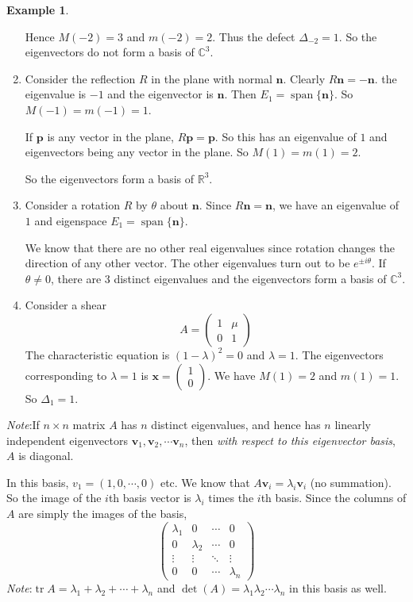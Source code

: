 \documentclass[a4paper]{article}
\theoremstyle{definition}
\newtheorem*{eg}{Example}
\newcommand{\mb}[1]{\mathbf{#1}}
\newcommand{\note}{\noindent \emph{Note}:\;}
\newcommand{\R}{\mathbb{R}}
\newcommand{\C}{\mathbb{C}}
\DeclareMathOperator\tr{tr}
\DeclareMathOperator\spn{span}
\begin{document}
\begin{eg}
\begin{enumerate}
     Hence $M(-2) = 3$ and $m(-2) = 2$. Thus the defect $\Delta_{-2} = 1$. So the eigenvectors do not form a basis of $\C^3$.
   \item Consider the reflection $R$ in the plane with normal $\mb{n}$. Clearly $R\mb{n} = -\mb{n}$. the eigenvalue is $-1$ and the eigenvector is $\mb{n}$. Then $E_1 = \spn\{\mb{n}\}$. So $M(-1) = m(-1) = 1$.

     If $\mb{p}$ is any vector in the plane, $R\mb{p} = \mb{p}$. So this has an eigenvalue of $1$ and eigenvectors being any vector in the plane. So $M(1) = m(1) = 2$.

     So the eigenvectors form a basis of $\R^3$.
   \item Consider a rotation $R$ by $\theta$ about $\mb{n}$. Since $R\mb{n} = \mb{n}$, we have an eigenvalue of $1$ and eigenspace $E_1 = \spn\{\mb{n}\}$.

     We know that there are no other real eigenvalues since rotation changes the direction of any other vector. The other eigenvalues turn out to be $e^{\pm i\theta}$. If $\theta \not= 0$, there are 3 distinct eigenvalues and the eigenvectors form a basis of $\C^3$.
   \item Consider a shear
     \[
     A = 
     \begin{pmatrix}
       1&\mu\\0&1
     \end{pmatrix}
     \]
     The characteristic equation is $(1 - \lambda)^2 = 0$ and $\lambda = 1$. The eigenvectors corresponding to $\lambda = 1$ is $\mb{x} = 
     \begin{pmatrix}
       1\\0
     \end{pmatrix}$. We have $M(1) = 2$ and $m(1) = 1$. So $\Delta_1 = 1$.
  \end{enumerate}
\end{eg}
\note If $n\times n$ matrix $A$ has $n$ distinct eigenvalues, and hence has $n$ linearly independent eigenvectors $\mb{v}_1, \mb{v}_2, \cdots \mb{v}_n$, then \emph{with respect to this eigenvector basis}, $A$ is diagonal.

In this basis, $v_1 = (1, 0, \cdots, 0)$ etc. We know that $A\mb{v}_i = \lambda_i\mb{v}_i$ (no summation). So the image of the $i$th basis vector is $\lambda_i$ times the $i$th basis. Since the columns of $A$ are simply the images of the basis,
\[
\begin{pmatrix}
  \lambda_1 & 0 & \cdots & 0\\
  0 & \lambda_2 & \cdots & 0\\
  \vdots & \vdots & \ddots & \vdots\\
  0 & 0 & \cdots & \lambda_n
\end{pmatrix}
\]
\note $\tr A = \lambda_1 + \lambda_2 + \cdots + \lambda_n$ and $\det(A) = \lambda_1\lambda_2\cdots \lambda_n$ in this basis as well.
\end{document}
